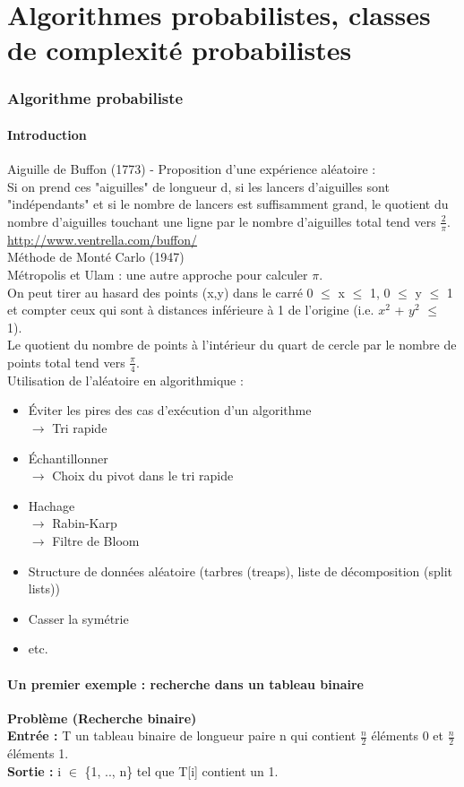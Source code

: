 \documentclass[12pt,a4paper]{article}
\begin{document}
\part{Algorithmes probabilistes, classes de complexité probabilistes}
\section{Algorithme probabiliste}
\subsection{Introduction}
Aiguille de Buffon (1773) - Proposition d'une expérience aléatoire :\\
Si on prend ces "aiguilles" de longueur d, si les lancers d'aiguilles sont "indépendants" et si le nombre de lancers est suffisamment grand, le quotient du nombre d'aiguilles touchant une ligne par le nombre d'aiguilles total tend vers $\frac{2}{\pi}$.\\
\url{http://www.ventrella.com/buffon/}\\
Méthode de Monté Carlo (1947)\\
Métropolis et Ulam : une autre approche pour calculer $\pi$.\\
On peut tirer au hasard des points (x,y) dans le carré 0 $\leq$ x $\leq$ 1, 0 $\leq$ y $\leq$ 1 et compter ceux qui sont à distances inférieure à 1 de l'origine (i.e. $x^2$ + $y^2$ $\leq$ 1).\\
Le quotient du nombre de points à l'intérieur du quart de cercle par le nombre de points total tend vers $\frac{\pi}{4}$.\\
Utilisation de l'aléatoire en algorithmique :
\begin{itemize}
	\item Éviter les pires des cas d'exécution d'un algorithme\\
	$\rightarrow$ Tri rapide
	\item Échantillonner\\
	$\rightarrow$ Choix du pivot dans le tri rapide
	\item Hachage\\
	$\rightarrow$ Rabin-Karp\\
	$\rightarrow$ Filtre de Bloom
	\item Structure de données aléatoire (tarbres (treaps), liste de décomposition (split lists))
	\item Casser la symétrie
	\item etc.
\end{itemize}
\subsection{Un premier exemple : recherche dans un tableau binaire}
\textbf{Problème (Recherche binaire)}\\
\textbf{Entrée :} T un tableau binaire de longueur paire n qui contient $\frac{n}{2}$ éléments 0 et $\frac{n}{2}$ éléments 1.\\
\textbf{Sortie :} i $\in$ \{1, .., n\} tel que T[i] contient un 1.
\end{document}
